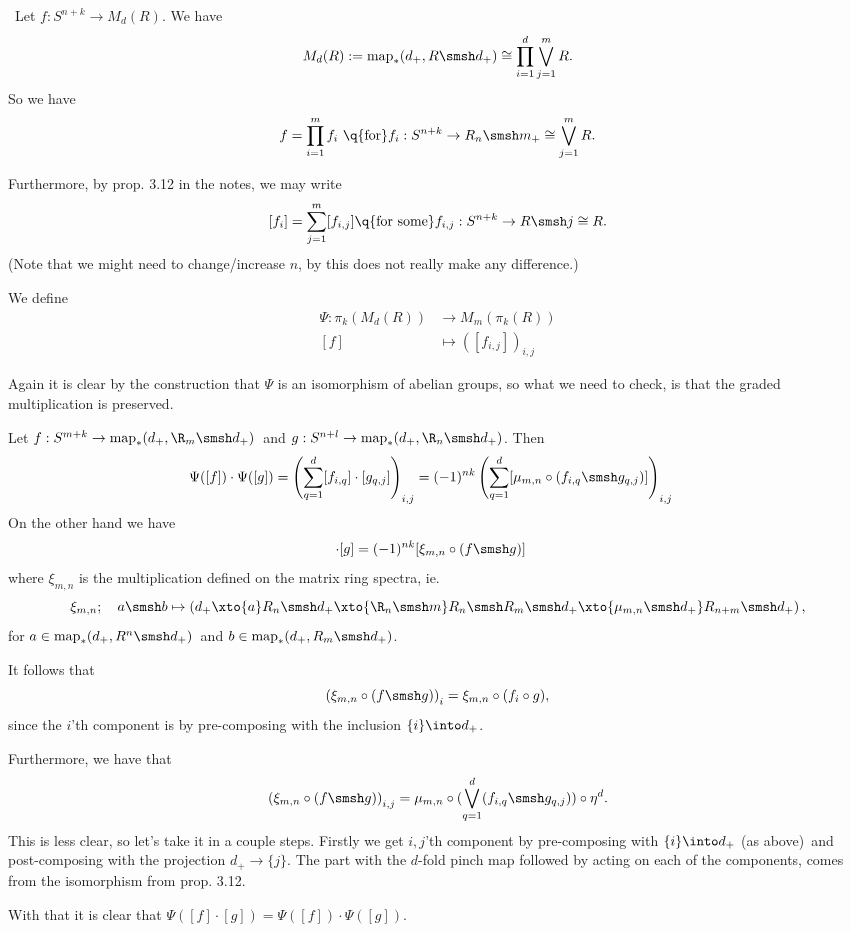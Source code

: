 \begin{exercise}[4]\ 
Let $f : S^{n+k} \to M_d(R)$. 
We have 
\[ M_d(R) := \map_*(d_+, R \smsh d_+) \cong \prod_{i=1}^{d}
\bigvee_{j=1}^{m} R. \] 
So we have
\[ f = \prod_{i=1}^m f_i \q{\text{for}} f_i : S^{n+k} \to R_n \smsh m_+ \cong \bigvee_{j=1}^{m} R.  \]

Furthermore, by prop. 3.12 in the notes, we may write 
\[ [f_i] = \sum_{j=1}^m [f_{i,j}] \q{\text{for some}} f_{i,j} : S^{n+k} \to R
\smsh j \cong R. \]
(Note that we might need to change/increase $n$, by this does not really make any
difference.) 

We define 
\begin{align*}
\Psi : \pi_k(M_d(R)) &\to M_m(\pi_k(R)) \\
[f] &\mapsto ([f_{i,j}])_{i,j}
\end{align*}

Again it is clear by the construction that $\Psi$ is an isomorphism of abelian
groups, so what we need to check, is that the graded multiplication is
preserved.

Let $f : S^{m+k} \to \map_*(d_+, \R_m\smsh d_+)$ and
$g : S^{n+l} \to \map_*(d_+, \R_n\smsh d_+)$. Then 
%
\begin{align*}
\Psi([f])\cdot \Psi([g]) &= \left(
\sum_{q=1}^d [f_{i,q}] \cdot [g_{q,j}] 
\right)_{i,j} 
= (-1)^{nk} \left(
\sum_{q=1}^d [\mu_{m,n} \circ (f_{i,q} \smsh g_{q,j})] 
\right)_{i,j}
\end{align*}
%
On the other hand we have 
\begin{align*}
[f] \cdot [g] &= (-1)^{nk} [\xi_{m,n} \circ (f \smsh g)]
\end{align*}
where $\xi_{m,n}$ is the multiplication defined on the matrix ring spectra, ie.
\[ \xi_{m,n};\quad a\smsh b \mapsto \left(d_+ \xto{a} R_n \smsh d_+ \xto{\R_n \smsh m} R_n
\smsh R_m \smsh d_+ \xto{\mu_{m,n}\smsh d_+} R_{n+m} \smsh d_+ \right), \]
for $a \in \map_*(d_+, R^n \smsh d_+)$ and $b \in \map_*(d_+,R_m\smsh d_+)$.

It follows that 
\[ \left(\xi_{m,n} \circ (f\smsh g) \right)_i = \xi_{m,n} \circ (f_i \circ g), \]
since the $i$'th component is by pre-composing with the inclusion $\{i\} \into d_+$.

Furthermore, we have that 
\[ \left(\xi_{m,n} \circ (f\smsh g)\right)_{i,j} = \mu_{m,n} \circ
(\bigvee_{q=1}^d (f_{i,q}\smsh g_{q,j})) \circ \eta^d.  \]
This is less clear, so let's take it in a couple steps. 
Firstly we get $i,j$'th component by pre-composing with $\{i\} \into d_+$ (as
above) and post-composing with the projection $d_+ \to \{j\}$. 
The part with the $d$-fold pinch map followed by acting on each of the
components, comes from the isomorphism from prop. 3.12.

With that it is clear that $\Psi([f]\cdot [g]) = \Psi([f]) \cdot \Psi([g])$. 
\end{exercise}




